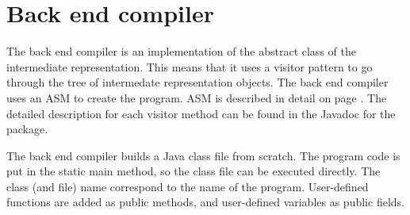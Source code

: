 \section{Back end compiler}

The back end compiler is an implementation of the  abstract class of the intermediate representation.
This means that it uses a visitor pattern to go through the tree of intermedate representation objects.
The back end compiler uses an ASM  to create the program.
ASM is described in detail on page \pageref{subj:asm}.
The detailed description for each visitor method can be found in the Javadoc for the  package.

The back end compiler builds a Java class file from scratch.
The program code is put in the static main method, so the class file can be executed directly.
The class (and file) name correspond to the name of the program.
User-defined functions are added as public methods, and user-defined variables as public fields.
